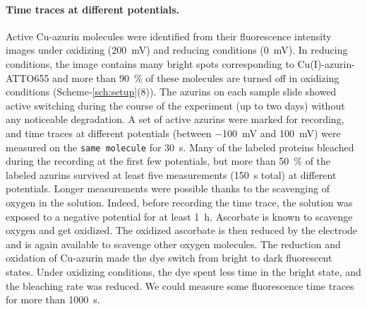 \paragraph*{Time traces at different potentials.}
Active Cu-azurin molecules were identified from their fluorescence intensity images under oxidizing (\SI{200}{\mV}) and reducing conditions (\SI{0}{\mV}).
In reducing conditions, the image contains many bright spots corresponding to Cu(I)-azurin-ATTO655 and more than \SI{90}{\percent} of these molecules are turned off in oxidizing conditions 
(Scheme-\ref{sch:setup}(8)).
The azurins on each sample slide showed active switching during the course of the experiment (up to two days) without any noticeable degradation.
A set of active azurins were marked for recording, and time traces at different potentials (between \SI{-100}{\mV} and \SI{100}{\mV}) were measured on the \texttt{same molecule} 
for \SI{30}{\s}.
Many of the labeled proteins bleached during the recording at the first few potentials, but more than \SI{50}{\percent} of the labeled azurins survived at least five measurements (\SI{150}{\s}  total) at different potentials.
Longer measurements were possible thanks to the scavenging of oxygen in the solution.
Indeed, before recording the time trace, the solution was exposed to a negative potential for at least \SI{1}{\hour}.
Ascorbate is known to  scavenge oxygen\cite{dave1997effectiveness} and get oxidized.
The oxidized ascorbate is then reduced by the electrode and is again available to scavenge other oxygen molecules.
The reduction and oxidation of Cu-azurin made the dye switch from bright to dark fluorescent states. Under oxidizing conditions, the dye spent less time in the bright state, and the bleaching rate was reduced.
We could measure some fluorescence time traces for more than \SI{1000}{\s}.\\
